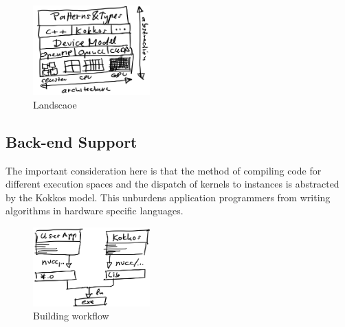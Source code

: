 



\begin{figure}
\centerline{\includegraphics[width=0.4\textwidth]{img/Stack.png}}
\caption{Landscaoe}
\label{fig:stack}
\end{figure}



\subsection{Back-end Support}\label{chap:kokkosBackend}


The important consideration here is that the method of compiling code for different execution spaces and the dispatch of kernels to instances is abstracted by the Kokkos model. This unburdens application programmers from writing algorithms in hardware specific languages.


\begin{figure}
\centerline{\includegraphics[width=0.4\textwidth]{img/Build.png}}
\caption{Building workflow}
\label{fig}
\end{figure}

